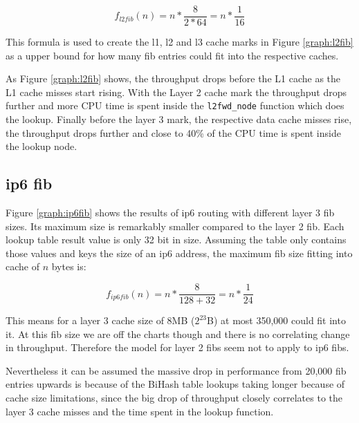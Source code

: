 $$ f_{l2fib}(n) = n * \frac{8}{2 * 64} = n * \frac{1}{16}  $$

This formula is used to create the l1, l2 and l3 cache marks in Figure
\ref{graph:l2fib} as a upper bound for how many fib entries could fit
into the respective caches. 

As Figure \ref{graph:l2fib} shows, the throughput drops before the L1
cache as the L1 cache misses start rising. With the Layer 2 cache mark
the throughput drops further and more CPU time is spent inside the
\lstinline|l2fwd_node| function which does the lookup. Finally before
the layer 3 mark, the respective data cache misses rise, the
throughput drops further and close to 40\% of the CPU time is spent
inside the lookup node.





\subsection{\Ac{ip6} \Ac{fib}}

Figure \ref{graph:ip6fib} shows the results of \Ac{ip6} routing with
different layer 3 \Ac{fib} sizes. Its maximum size is remarkably
smaller compared to the layer 2 \Ac{fib}. Each lookup table result
value is only 32 bit in size. Assuming the table only contains those
values and keys the size of an \Ac{ip6} address, the maximum \Ac{fib}
size fitting into cache of $n$ bytes is:

$$ f_{ip6fib}(n) = n * \frac{8}{128 + 32} = n * \frac{1}{24}  $$

This means for a layer 3 cache size of 8MB ($2^{23}$B) at most 350,000
could fit into it. At this \Ac{fib} size we are off the charts though
and there is no correlating change in throughput. Therefore the model
for layer 2 \Ac{fib}s seem not to apply to \Ac{ip6} \Ac{fib}s.



Nevertheless it can be assumed the massive drop in performance from
20,000 \Ac{fib} entries upwards is because of the BiHash table lookups
taking longer because of cache size limitations, since the big drop of
throughput closely correlates to the layer 3 cache misses and the time
spent in the lookup function.







